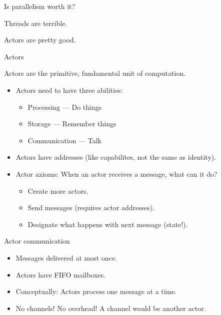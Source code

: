 \documentclass[aspectratio=169]{beamer}
\newcommand{\megatext}[1]{
  \begin{center}
    \Huge
    #1
  \end{center}
}
\begin{document}
\begin{frame}
  \megatext{Is parallelism worth it?}
\end{frame}

\begin{frame}
  \megatext{Threads are terrible.}
\end{frame}


\begin{frame}
  \megatext{Actors are pretty good.}
\end{frame}


\begin{frame}{Actors}

  Actors are the primitive, fundamental unit of computation.

  \begin{itemize}
  \item Actors need to have three abilities:
    \begin{itemize}
    \item Processing --- Do things
    \item Storage --- Remember things
    \item Communication --- Talk
    \end{itemize}

  \item Actors have addresses (like capabilites, not the same as identity).

  \item Actor axioms: When an actor receives a message, what can it do?
    \begin{itemize}
    \item Create more actors.
    \item Send messages (requires actor addresses).
    \item Designate what happens with next message (state!).
    \end{itemize}
  \end{itemize}
\end{frame}

\begin{frame}{Actor communication}
  \begin{figure}
  \end{figure}

  \begin{itemize}
  \item Messages delivered at most once.
  \item Actors have FIFO mailboxes.
  \item Conceptually: Actors process one message at a time.
  \item No channels! No overhead! A channel would be another actor.
  \end{itemize}
\end{frame}
\end{document}
